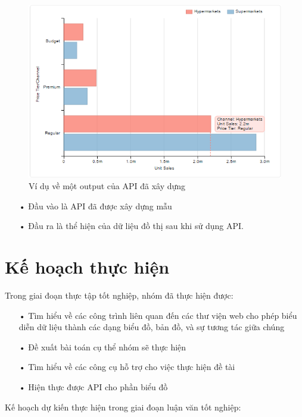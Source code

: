 \documentclass[12pt,a4paper,oneside]{article}
\begin{document}
\begin{figure}[htp]
    \includegraphics[scale=.8]{image/api_sample}
    \caption{Ví dụ về một output của API đã xây dựng}
    \label{refhinh21}
\end{figure}

\begin{itemize}
\item[•] Đầu vào là API đã được xây dựng mẫu
\item[•] Đầu ra là thể hiện của dữ liệu đồ thị sau khi sử dụng API.
\end{itemize}

\section{Kế hoạch thực hiện}
Trong giai đoạn thực tập tốt nghiệp, nhóm đã thực hiện được:

\begin{itemize}
\item[•]Tìm hiểu về các công trình liên quan đến các thư viện web cho phép biểu diễn dữ liệu thành các dạng biểu đồ, bản đồ, và sự tương tác giữa chúng

\item[•]Đề xuất bài toán cụ thể nhóm sẽ thực hiện

\item[•]Tìm hiểu về các công cụ hỗ trợ cho việc thực hiện đề tài

\item[•]Hiện thực được API cho phần biểu đồ

\end{itemize}
Kế hoạch dự kiến thực hiện trong giai đoạn luận văn tốt nghiệp:
\end{document}
